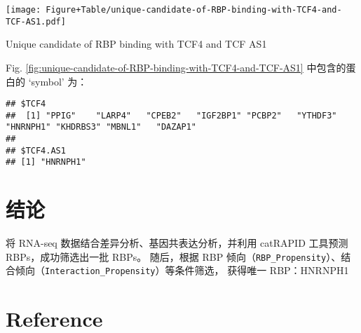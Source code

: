 \documentclass[
]{article}
\begin{document}
\def\@captype{figure}
\begin{center}
\texttt{[image: Figure+Table/unique-candidate-of-RBP-binding-with-TCF4-and-TCF-AS1.pdf]}
\caption{Unique candidate of RBP binding with TCF4 and TCF AS1}\label{fig:unique-candidate-of-RBP-binding-with-TCF4-and-TCF-AS1}
\end{center}

Fig. \ref{fig:unique-candidate-of-RBP-binding-with-TCF4-and-TCF-AS1} 中包含的蛋白的 `symbol' 为：

\begin{verbatim}
## $TCF4
##  [1] "PPIG"    "LARP4"   "CPEB2"   "IGF2BP1" "PCBP2"   "YTHDF3"  "HNRNPH1" "KHDRBS3" "MBNL1"   "DAZAP1" 
## 
## $TCF4.AS1
## [1] "HNRNPH1"
\end{verbatim}

\hypertarget{dis}{%
\section{结论}\label{dis}}

将 RNA-seq 数据结合差异分析、基因共表达分析，并利用 catRAPID 工具预测 RBPs，成功筛选出一批 RBPs。
随后，根据 RBP 倾向（\texttt{RBP\_Propensity}）、结合倾向（\texttt{Interaction\_Propensity}）等条件筛选，
获得唯一 RBP：HNRNPH1

\hypertarget{bibliography}{%
\section*{Reference}\label{bibliography}}
\end{document}
